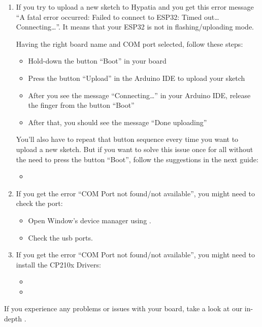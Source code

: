 \begin{enumerate}
  \item If you try to upload a new sketch to Hypatia and you get this error message ``A fatal error occurred: Failed to connect to ESP32: Timed out\ldots Connecting\ldots''. It means that your ESP32 is not in flashing/uploading mode.

  \bigskip
  
  Having the right board name and COM port selected, follow these steps:
  
  \begin{itemize}
    \item Hold-down the button ``Boot'' in your board
    \item Press the button ``Upload'' in the Arduino IDE to upload your sketch
    \item After you see the  message ``Connecting\ldots'' in your Arduino IDE, release the finger from the button ``Boot''
    \item After that, you should see the message ``Done uploading''
  \end{itemize}


  \medskip
  
  You'll also have to repeat that button sequence every time you want to upload a new sketch. But if you want to solve this issue once for all without the need to press the button ``Boot'', follow the suggestions in the next guide:

  \begin{itemize}
    \item {}
  \end{itemize}

  \item  If you get the error ``COM Port not found/not available'', you might need to check the port: 

    \begin{itemize}
      \item Open Window's device manager using  .
      \item Check the usb ports.
     \end{itemize}

  \item  If you get the error ``COM Port not found/not available'', you might need to install the CP210x Drivers:

  \begin{itemize}
    \item {}
    \item {}
  \end{itemize}

\end{enumerate}


If you experience any problems or issues with your board, take a look at our in-depth .

